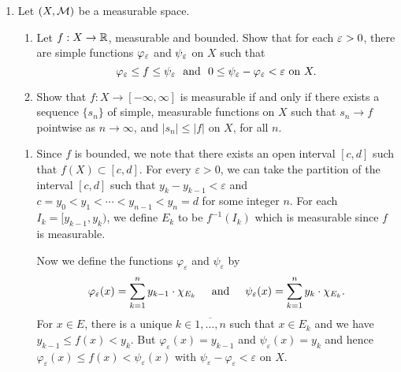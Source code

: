 \documentclass[12pt]{article}
\begin{document}
\begin{enumerate}

    \item Let $(X, \mathcal{M})$ be a measurable space.
    \begin{enumerate}
    \item Let $f: X \to \mathbb{R}$, measurable and bounded.
    Show that for each $\varepsilon > 0$, there are simple functions
    $\varphi_{\varepsilon}$ and $\psi_{\varepsilon}$ on $X$ such that
    $$\varphi_{\varepsilon} \leq f \leq \psi_{\varepsilon} \ \ \text{and} \ \ 0 \leq \psi_{\varepsilon} -  \varphi_{\varepsilon}  < \varepsilon \ \text{on} \ X.$$
    
    \item Show that $f:X\to [-\infty, \infty]$ is
    measurable if and only if there exists a sequence
    $\{s_n\}$ of simple, measurable functions
    on $X$ such that $s_n \to f$ pointwise as
    $n \to \infty$, and $|s_n| \leq |f|$ on $X$, for
    all $n$.
    
    \end{enumerate}
    
    \begin{mybox}
        \begin{enumerate}
            \item Since $f$ is bounded, we note that there exists an open
            interval $[c,d]$ such that $f(X)\subset [c,d]$. For every
            $\varepsilon>0$, we can take the partition of the interval
            $[c,d]$ such that $y_{k}-y_{k-1}<\varepsilon$ and
            $c=y_0<y_1<\cdots<y_{n-1}<y_n=d$ for some integer $n$. For
            each $I_k=[y_{k-1},y_k)$, we define $E_k$ to be
            $f^{-1}(I_k)$ which is measurable since $f$ is measurable.

            \vspace*{2mm}
            Now we define the functions $\varphi_\varepsilon$ and
            $\psi_\varepsilon$ by
            $$\varphi_\varepsilon(x)=\sum_{k=1}^{n}{y_{k-1}\cdot
            \chi_{E_k}}\hspace*{5mm}\text{and}\hspace*{5mm}
            \psi_\varepsilon(x)=\sum_{k=1}^{n}{y_k\cdot\chi_{E_k}}.$$
            For $x\in E$, there is a unique $k\in \overline{1,\ldots,n}$
            such that $x\in E_k$ and we have $y_{k-1}\leq f(x)<y_k$.
            But $\varphi_\varepsilon(x)=y_{k-1}$ and $\psi_\varepsilon(x)
            =y_k$ and hence $\varphi_\varepsilon(x)\leq f(x)<\psi
            _\varepsilon(x)$ with $\psi_\varepsilon-\varphi_\varepsilon
            <\varepsilon$ on $X$.


\end{enumerate}
\end{mybox}
\end{enumerate}
\end{document}
